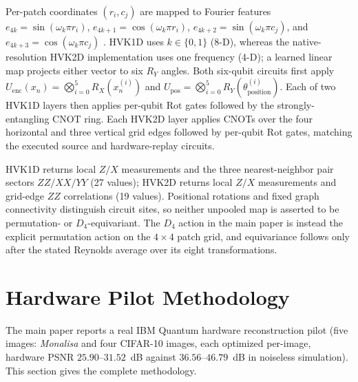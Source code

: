 \documentclass[11pt]{article}
\begin{document}
\begin{sloppypar}
Per-patch coordinates $(r_i,c_j)$ are mapped to Fourier features $e_{4k}=\sin(\omega_k\pi r_i)$, $e_{4k+1}=\cos(\omega_k\pi r_i)$, $e_{4k+2}=\sin(\omega_k\pi c_j)$, and $e_{4k+3}=\cos(\omega_k\pi c_j)$ \cite{Xu2021}. HVK1D uses $k\in\{0,1\}$ (8-D), whereas the native-resolution HVK2D implementation uses one frequency (4-D); a learned linear map projects either vector to six $R_Y$ angles. Both six-qubit circuits first apply $U_{\text{enc}}(x_n)=\bigotimes_{i=0}^{5}R_X(x_n^{(i)})$ and $U_{\text{pos}}=\bigotimes_{i=0}^{5}R_Y(\theta_{\text{position}}^{(i)})$. Each of two HVK1D layers then applies per-qubit $\mathrm{Rot}$ gates followed by the strongly-entangling CNOT ring. Each HVK2D layer applies CNOTs over the four horizontal and three vertical grid edges followed by per-qubit $\mathrm{Rot}$ gates, matching the executed source and hardware-replay circuits.

HVK1D returns local $Z/X$ measurements and the three nearest-neighbor pair sectors $ZZ/XX/YY$ (27 values); HVK2D returns local $Z/X$ measurements and grid-edge $ZZ$ correlations (19 values). Positional rotations and fixed graph connectivity distinguish circuit sites, so neither unpooled map is asserted to be permutation- or $D_4$-equivariant. The $D_4$ action in the main paper is instead the explicit permutation action on the $4\times4$ patch grid, and equivariance follows only after the stated Reynolds average over its eight transformations.
\end{sloppypar}

\section{Hardware Pilot Methodology}
\label{sec:hardware_methodology}
The main paper reports a real IBM Quantum hardware reconstruction pilot (five images: \textit{Monalisa} and four CIFAR-10 images, each optimized per-image, hardware PSNR $25.90$--$31.52$~dB against $36.56$--$46.79$~dB in noiseless simulation). This section gives the complete methodology.
\end{document}
